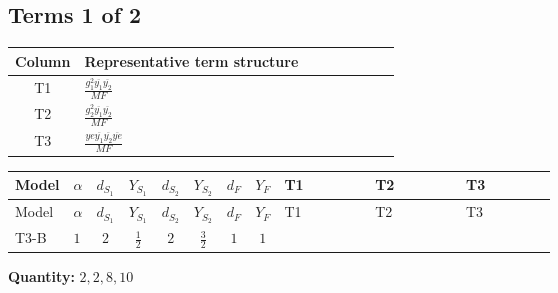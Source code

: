 \documentclass[8pt]{article}
\begin{document}
\begin{landscape}
\subsection*{Terms 1 of 2}
\begin{center}
\begin{tabular}{@{}c >{\raggedright\arraybackslash}p{0.82\linewidth}@{}}
\toprule
Column & Representative term structure \\
\midrule
T1 & \(\displaystyle \frac{g_{1}^{2} \overline{y_{1}} \overline{y_{2}}}{MF}\) \\
\midrule
T2 & \(\displaystyle \frac{g_{2}^{2} \overline{y_{1}} \overline{y_{2}}}{MF}\) \\
\midrule
T3 & \(\displaystyle \frac{ye \overline{y_{1}} \overline{y_{2}} \overline{ye}}{MF}\) \\
\midrule
\bottomrule
\end{tabular}
\end{center}
\smallskip
\tiny
\begin{longtable}{@{}llcccccc >{\raggedright\arraybackslash}p{0.21\linewidth} >{\raggedright\arraybackslash}p{0.21\linewidth} >{\raggedright\arraybackslash}p{0.21\linewidth}@{}}
\toprule
Model & $\alpha$ & $d_{S_1}$ & $Y_{S_1}$ & $d_{S_2}$ & $Y_{S_2}$ & $d_F$ & $Y_F$ & T1 & T2 & T3 \\
\midrule
\endfirsthead
\toprule
Model & $\alpha$ & $d_{S_1}$ & $Y_{S_1}$ & $d_{S_2}$ & $Y_{S_2}$ & $d_F$ & $Y_F$ & T1 & T2 & T3 \\
\midrule
\endhead
T3-B & $1$ & $2$ & $\frac{1}{2}$ & $2$ & $\frac{3}{2}$ & $1$ & $1$ & \scriptsize\adjustbox{max width=\linewidth}{$\begin{gathered} \frac{3 g_{1}^{2} \overline{y_{1}} \overline{y_{2}}}{2 MF}\end{gathered}$} & \scriptsize\adjustbox{max width=\linewidth}{$\begin{gathered} \frac{3 g_{2}^{2} \overline{y_{1}} \overline{y_{2}}}{4 MF}\end{gathered}$} & \scriptsize\adjustbox{max width=\linewidth}{$\begin{gathered} - \frac{ye \overline{y_{1}} \overline{y_{2}} \overline{ye}}{4 MF}\end{gathered}$} \\
\midrule
\bottomrule
\end{longtable}
\clearpage
\noindent\textbf{Quantity: }$\mathrm{2,2,8,10}$\par\smallskip

\end{landscape}
\end{document}
